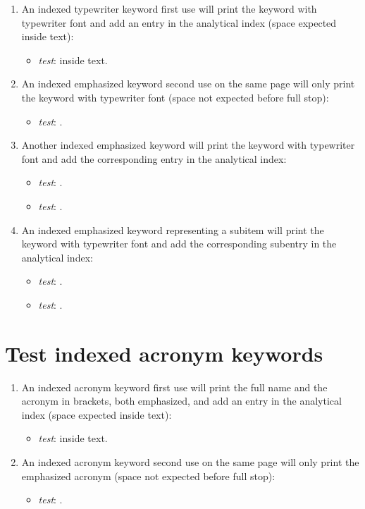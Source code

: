 \begin{enumerate}

\item An indexed typewriter keyword first use will print the keyword with typewriter font and add an entry in the analytical index (space expected inside text):
\begin{itemize}
\item \textit{test}: \idxTtKeyOne inside text.
\end{itemize}

\item An indexed emphasized keyword second use on the same page will only print the keyword with typewriter font (space not expected before full stop): 
\begin{itemize}
\item \textit{test}: \idxTtKeyOne.
\end{itemize}

\item Another indexed emphasized keyword will print the keyword with typewriter font and add the corresponding entry in the analytical index: 
\begin{itemize}
\item \textit{test}: \idxTtKeyTwo.
\item \textit{test}: \idxTtKeyThree.
\end{itemize}

\item An indexed emphasized keyword representing a subitem will print the keyword with typewriter font and add the corresponding subentry in the analytical index: 
\begin{itemize}
\item \textit{test}: \idxTtKeyTwoSub.
\item \textit{test}: \idxTtKeyThreeSubsub.
\end{itemize}

\end{enumerate}

\section{Test indexed acronym keywords}

\begin{enumerate}

\item An indexed acronym keyword first use will print the full name and the acronym in brackets, both emphasized, and add an entry in the analytical index (space expected inside text):
\begin{itemize}
\item \textit{test}: \IAKE inside text.
\end{itemize}

\item An indexed acronym keyword second use on the same page will only print the emphasized acronym (space not expected before full stop): 
\begin{itemize}
\item \textit{test}: \IAKE.
\end{itemize}

\end{enumerate}

